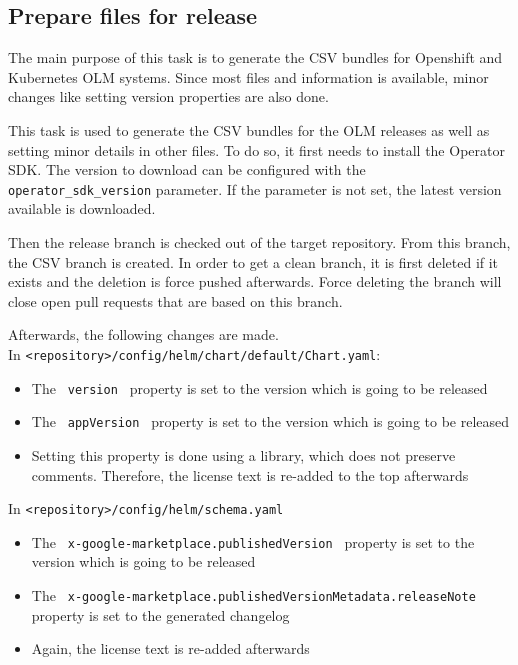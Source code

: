 \subsection{Prepare files for release}\label{subsec:prepare-files-for-release}

The main purpose of this task is to generate the CSV bundles for Openshift and Kubernetes OLM systems.
Since most files and information is available, minor changes like setting version properties are also done.

\pagebreak

This task is used to generate the CSV bundles for the OLM releases as well as setting minor details in other files.
To do so, it first needs to install the Operator SDK.
The version to download can be configured with the \verb|operator_sdk_version| parameter.
If the parameter is not set, the latest version available is downloaded.

Then the release branch is checked out of the target repository.
From this branch, the CSV branch is created.
In order to get a clean branch, it is first deleted if it exists and the deletion is force pushed afterwards.
Force deleting the branch will close open pull requests that are based on this branch.

Afterwards, the following changes are made. \\
In \verb|<repository>/config/helm/chart/default/Chart.yaml|:
\begin{itemize}
    \item The \verb| version | property is set to the version which is going to be released
    \item The \verb| appVersion | property is set to the version which is going to be released
    \item Setting this property is done using a library, which does not preserve comments.
    Therefore, the license text is re-added to the top afterwards
\end{itemize}

In \verb|<repository>/config/helm/schema.yaml|
\begin{itemize}
    \item The \verb| x-google-marketplace.publishedVersion | property is set to the version which is going to be released
    \item The \verb| x-google-marketplace.publishedVersionMetadata.releaseNote | property is set to the generated changelog
    \item Again, the license text is re-added afterwards
\end{itemize}


